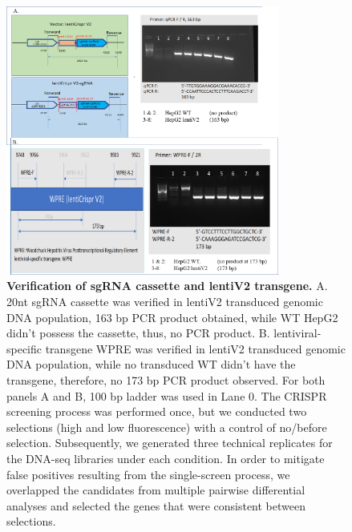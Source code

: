 \documentclass[
  a4paper,
]{article}
\newenvironment{fignos:tagged-figure}[1][]{
  \let\oldfigurename\figurename
  \renewcommand{\figurename}{Supplementary Figure}
}{
  \let\figurename\oldfigurename
}
\begin{document}
\begin{fignos:tagged-figure}[S10]

\begin{figure}
\hypertarget{fig:sup:crispr:fig3}{%
\centering
\includegraphics[width=0.8\textwidth,height=\textheight]{images/crispr/figure3.png}
\caption{\textbf{Verification of sgRNA cassette and lentiV2 transgene.}
A. 20nt sgRNA cassette was verified in lentiV2 transduced genomic DNA population, 163 bp PCR product obtained, while WT HepG2 didn't possess the cassette, thus, no PCR product.
B. lentiviral-specific transgene WPRE was verified in lentiV2 transduced genomic DNA population, while no transduced WT didn't have the transgene, therefore, no 173 bp PCR product observed.
For both panels A and B, 100 bp ladder was used in Lane 0.
The CRISPR screening process was performed once, but we conducted two selections (high and low fluorescence) with a control of no/before selection. Subsequently, we generated three technical replicates for the DNA-seq libraries under each condition. In order to mitigate false positives resulting from the single-screen process, we overlapped the candidates from multiple pairwise differential analyses and selected the genes that were consistent between selections.}\label{fig:sup:crispr:fig3}
}
\end{figure}

\end{fignos:tagged-figure}
\end{document}
